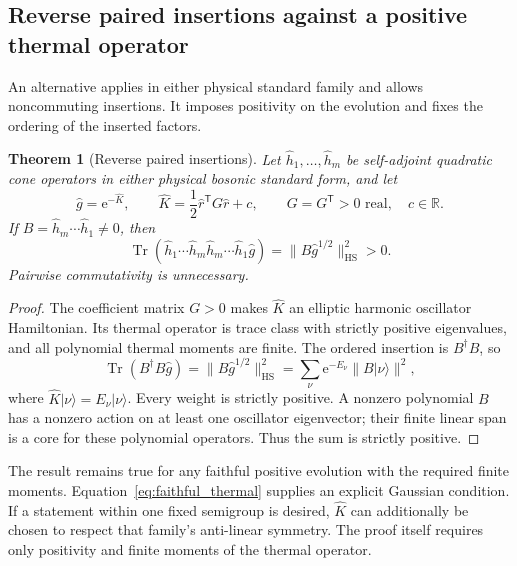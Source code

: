 \documentclass[11pt,a4paper]{article}
\newcommand{\Tr}{\operatorname{Tr}}
\newcommand{\ee}{\mathrm e}
\newcommand{\trans}{\mathsf T}
\newcommand{\HS}{\mathrm{HS}}
\newtheorem{theorem}{Theorem}
\theoremstyle{remark}
\numberwithin{equation}{section}
\begin{document}
\subsection{Reverse paired insertions against a positive thermal operator}

An alternative applies in either physical standard family and allows
noncommuting insertions. It imposes positivity on the evolution and fixes
the ordering of the inserted factors.

\begin{theorem}[Reverse paired insertions]
\label{thm:paired}
Let \(\hat h_1,\ldots,\hat h_m\) be self-adjoint quadratic cone operators
in either physical bosonic standard form, and let
\begin{equation}
\hat g=\ee^{-\hat K},\qquad
\hat K=\frac12\hat r^\trans G\hat r+c,
\qquad G=G^\trans>0\text{ real},\quad c\in\mathbb R.
\label{eq:faithful_thermal}
\end{equation}
If \(B=\hat h_m\cdots\hat h_1\ne0\), then
\begin{equation}
\boxed{\Tr(\hat h_1\cdots\hat h_m\hat h_m\cdots\hat h_1\hat g)
=\|B\hat g^{1/2}\|_{\HS}^2>0.}
\label{eq:paired_positive}
\end{equation}
Pairwise commutativity is unnecessary.
\end{theorem}

\begin{proof}
The coefficient matrix \(G>0\) makes \(\hat K\) an elliptic harmonic
oscillator Hamiltonian. Its thermal operator is trace class with strictly
positive eigenvalues, and all polynomial thermal moments are finite. The
ordered insertion is \(B^\dagger B\), so
\begin{equation}
\Tr(B^\dagger B\hat g)
=\|B\hat g^{1/2}\|_{\HS}^2
=\sum_\nu\ee^{-E_\nu}\|B|\nu\rangle\|^2,
\label{eq:thermal_squared_norm}
\end{equation}
where \(\hat K|\nu\rangle=E_\nu|\nu\rangle\). Every weight is strictly
positive. A nonzero polynomial \(B\) has a nonzero action on at least one
oscillator eigenvector; their finite linear span is a core for these
polynomial operators. Thus the sum is strictly positive.
\end{proof}

The result remains true for any faithful positive evolution with the
required finite moments. Equation~\eqref{eq:faithful_thermal} supplies an
explicit Gaussian condition. If a statement within one fixed semigroup is
desired, \(\hat K\) can additionally be chosen to respect that family's
anti-linear symmetry. The proof itself requires only positivity and finite
moments of the thermal operator.
\end{document}
